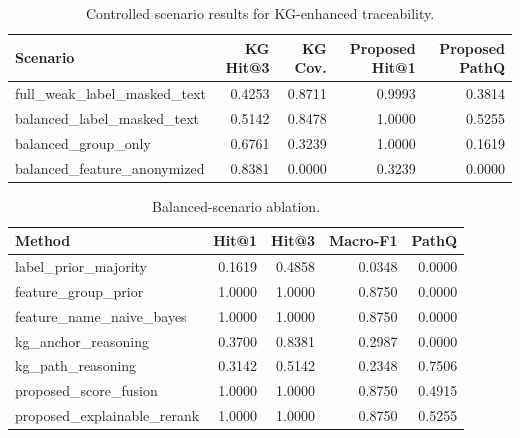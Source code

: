 \begin{table}[t]
\centering
\caption{Controlled scenario results for KG-enhanced traceability.}
\begin{tabular}{lrrrr}
\toprule
Scenario & KG Hit@3 & KG Cov. & Proposed Hit@1 & Proposed PathQ \\
\midrule
full\_weak\_label\_masked\_text & 0.4253 & 0.8711 & 0.9993 & 0.3814 \\
balanced\_label\_masked\_text & 0.5142 & 0.8478 & 1.0000 & 0.5255 \\
balanced\_group\_only & 0.6761 & 0.3239 & 1.0000 & 0.1619 \\
balanced\_feature\_anonymized & 0.8381 & 0.0000 & 0.3239 & 0.0000 \\
\bottomrule
\end{tabular}
\end{table}

\begin{table}[t]
\centering
\caption{Balanced-scenario ablation.}
\begin{tabular}{lrrrr}
\toprule
Method & Hit@1 & Hit@3 & Macro-F1 & PathQ \\
\midrule
label\_prior\_majority & 0.1619 & 0.4858 & 0.0348 & 0.0000 \\
feature\_group\_prior & 1.0000 & 1.0000 & 0.8750 & 0.0000 \\
feature\_name\_naive\_bayes & 1.0000 & 1.0000 & 0.8750 & 0.0000 \\
kg\_anchor\_reasoning & 0.3700 & 0.8381 & 0.2987 & 0.0000 \\
kg\_path\_reasoning & 0.3142 & 0.5142 & 0.2348 & 0.7506 \\
proposed\_score\_fusion & 1.0000 & 1.0000 & 0.8750 & 0.4915 \\
proposed\_explainable\_rerank & 1.0000 & 1.0000 & 0.8750 & 0.5255 \\
\bottomrule
\end{tabular}
\end{table}
